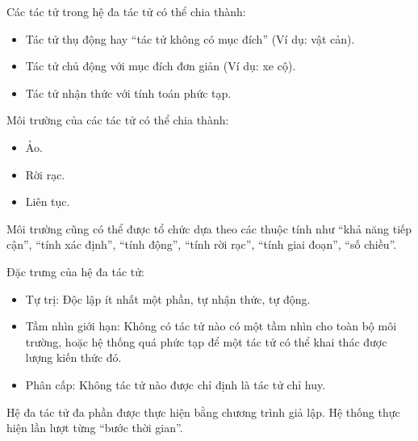 \documentclass[../report.tex]{subfiles}
\begin{document}
Các tác tử trong hệ đa tác tử có thể chia thành:
\begin{itemize}
    \item Tác tử thụ động hay ``tác tử không có mục đích'' (Ví dụ: vật cản).
    \item Tác tử chủ động với mục đích đơn giản (Ví dụ: xe cộ). 
    \item Tác tử nhận thức với tính toán phức tạp. 
\end{itemize}

Môi trường của các tác tử có thể chia thành:
\begin{itemize}
    \item Ảo.
    \item Rời rạc.
    \item Liên tục. 
\end{itemize}

Môi trường cũng có thể được tổ chức dựa theo các thuộc tính như ``khả năng tiếp cận'', ``tính xác định'', ``tính động'', ``tính rời rạc'',
``tính giai đoạn'', ``số chiều''. 

Đặc trưng của hệ đa tác tử: 
\begin{itemize}
    \item Tự trị: Độc lập ít nhất một phần, tự nhận thức, tự động.
    \item Tầm nhìn giới hạn: Không có tác tử nào có một tầm nhìn cho toàn bộ môi trường, hoặc hệ thống quá phức tạp để
        một tác tử có thể khai thác được lượng kiến thức đó. 
    \item Phân cấp: Không tác tử nào được chỉ định là tác tử chỉ huy. 
\end{itemize}

Hệ đa tác tử đa phần được thực hiện bằng chương trình giả lập. Hệ thống thực hiện lần lượt từng ``bước thời gian''. 
\end{document}
